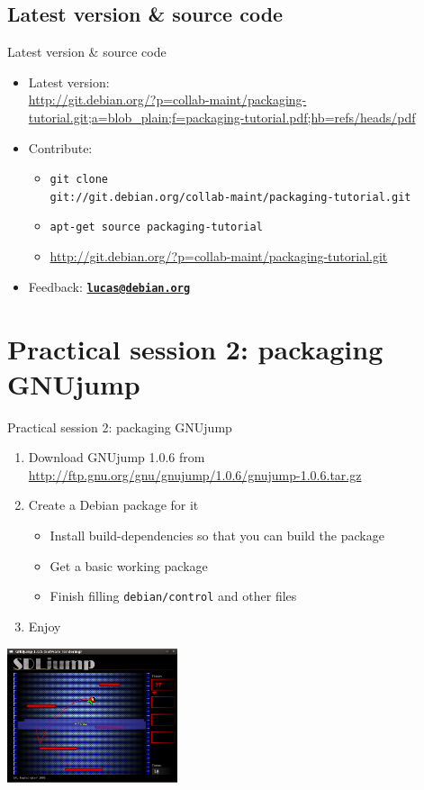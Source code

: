 \documentclass[10pt,final]{beamer}
\begin{document}
\subsection{Latest version \& source code}
\begin{frame}{Latest version \& source code}
  \begin{itemize}
  \item Latest version:\\
    {\footnotesize \url{http://git.debian.org/?p=collab-maint/packaging-tutorial.git;a=blob\_plain;f=packaging-tutorial.pdf;hb=refs/heads/pdf}}
  \end{itemize}
  
  \begin{itemize}
  \item Contribute:
	  \begin{itemize}
		  \item  {\small \texttt{git clone\\ git://git.debian.org/collab-maint/packaging-tutorial.git}}
    \hbr
    \item {\small \texttt{apt-get source packaging-tutorial}}
    \hbr
    \item {\small \url{http://git.debian.org/?p=collab-maint/packaging-tutorial.git}}
    \end{itemize}
    \br
  \item Feedback: \href{mailto:lucas@debian.org}{\textbf{\texttt{lucas@debian.org}}}
  \end{itemize}
\end{frame}

\section{Practical session 2: packaging GNUjump}
\begin{frame}{Practical session 2: packaging GNUjump}
\begin{enumerate}
	\item Download GNUjump 1.0.6 from
		\url{http://ftp.gnu.org/gnu/gnujump/1.0.6/gnujump-1.0.6.tar.gz}
		\br
	\item Create a Debian package for it
		\begin{itemize}
			\item Install build-dependencies so that you can build the package
			\item Get a basic working package
			\item Finish filling \texttt{debian/control} and other files
		\end{itemize}
		\br
	\item Enjoy
\end{enumerate}
\centerline{\includegraphics[width=5cm]{figs/gnujump.png}}
\end{frame}
\end{document}
